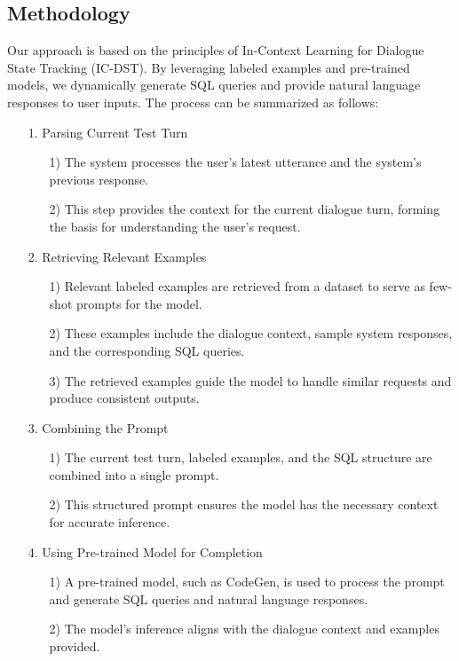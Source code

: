 \documentclass[conference]{IEEEtran}
\begin{document}
\subsection{Methodology}

Our approach is based on the principles of In-Context Learning for Dialogue State Tracking (IC-DST). By leveraging labeled examples and pre-trained models, we dynamically generate SQL queries and provide natural language responses to user inputs. The process can be summarized as follows: \\
    
\begin{enumerate}
    \item[1.] Parsing Current Test Turn
    \begin{itemize}
    \item[1)] The system processes the user's latest utterance and the system's previous response.
    \item[2)] This step provides the context for the current dialogue turn, forming the basis for understanding the user's request. \\
    \end{itemize} 

\item[2.] Retrieving Relevant Examples
\begin{itemize}
    \item[1)] Relevant labeled examples are retrieved from a dataset to serve as few-shot prompts for the model.
    \item[2)] These examples include the dialogue context, sample system responses, and the corresponding SQL queries.
    \item[3)] The retrieved examples guide the model to handle similar requests and produce consistent outputs. \\
\end{itemize} 

\item[3.] Combining the Prompt
\begin{itemize}
    \item[1)] The current test turn, labeled examples, and the SQL structure are combined into a single prompt.
    \item[2)] This structured prompt ensures the model has the necessary context for accurate inference. \\
\end{itemize} 

\item[4.] Using Pre-trained Model for Completion
\begin{itemize}
    \item[1)] A pre-trained model, such as CodeGen, is used to process the prompt and generate SQL queries and natural language responses.
    \item[2)] The model's inference aligns with the dialogue context and examples provided. \\
\end{itemize} 


\end{enumerate}
\end{document}
